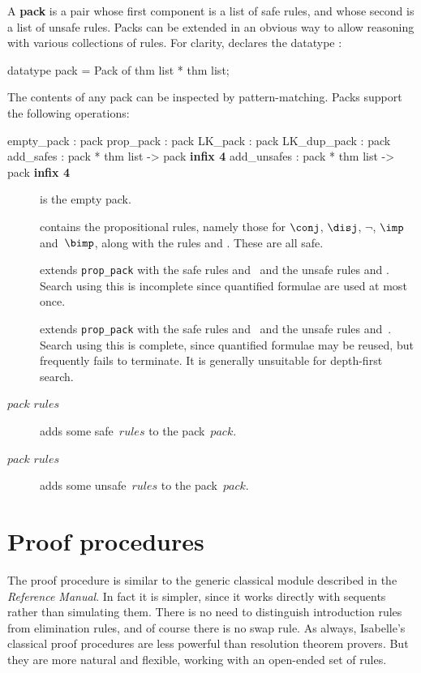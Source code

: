 A {\bf pack} is a pair whose first component is a list of safe
rules, and whose second is a list of unsafe rules.  Packs can be extended
in an obvious way to allow reasoning with various collections of rules.
For clarity, \LK{} declares the datatype
:
\begin{ttbox}
datatype pack = Pack of thm list * thm list;
\end{ttbox}
The contents of any pack can be inspected by pattern-matching.  Packs
support the following operations:
\begin{ttbox} 
empty_pack  : pack
prop_pack   : pack
LK_pack     : pack
LK_dup_pack : pack
add_safes   : pack * thm list -> pack               \hfill{\bf infix 4}
add_unsafes : pack * thm list -> pack               \hfill{\bf infix 4}
\end{ttbox}
\begin{description}
\item[] is the empty pack.

\item[] contains the propositional rules, namely
those for $\conj$, $\disj$, $\neg$, $\imp$ and~$\bimp$, along with the
rules  and .  These are all safe.

\item[] 
extends {\tt prop_pack} with the safe rules 
and~ and the unsafe rules  and
.  Search using this is incomplete since quantified
formulae are used at most once.

\item[] 
extends {\tt prop_pack} with the safe rules 
and~ and the unsafe rules  and~.
Search using this is complete, since quantified formulae may be reused, but
frequently fails to terminate.  It is generally unsuitable for depth-first
search.

\item[$pack$  $rules$] 
adds some safe~$rules$ to the pack~$pack$.

\item[$pack$  $rules$] 
adds some unsafe~$rules$ to the pack~$pack$.
\end{description}


\section{Proof procedures}
The \LK{} proof procedure is similar to the generic classical module
described in the {\em Reference Manual}.  In fact it is simpler, since it
works directly with sequents rather than simulating them.  There is no need
to distinguish introduction rules from elimination rules, and of course
there is no swap rule.  As always, Isabelle's classical proof procedures
are less powerful than resolution theorem provers.  But they are more
natural and flexible, working with an open-ended set of rules.

